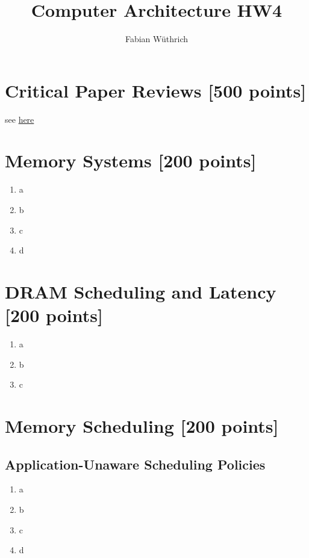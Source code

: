 \documentclass[a4paper]{article}
\title{Computer Architecture HW4}
\author{Fabian Wüthrich}
\begin{document}
\maketitle

\section{Critical Paper Reviews [500 points]}

see \href{https://safari.ethz.ch/review/architecture20/}{here}

\section{Memory Systems [200 points]}

\begin{enumerate}[label=\alph*)]
    \item a
    \item b
    \item c
    \item d
\end{enumerate}

\section{DRAM Scheduling and Latency [200 points]}

\begin{enumerate}[label=\alph*)]
    \item a
    \item b
    \item c
\end{enumerate}

\section{Memory Scheduling [200 points]}

\subsection{Application-Unaware Scheduling Policies}

\begin{enumerate}[label=\alph*)]
    \item a
    \item b
    \item c
    \item d
\end{enumerate}
\end{document}
